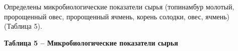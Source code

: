 Определены микробиологические показатели сырья (топинамбур молотый,
пророщенный овес, пророщенный ячмень, корень солодки, овес, ячмень)
(Таблица 5).

{\bfseries Таблица 5 -- Микробиологические показатели сырья}

